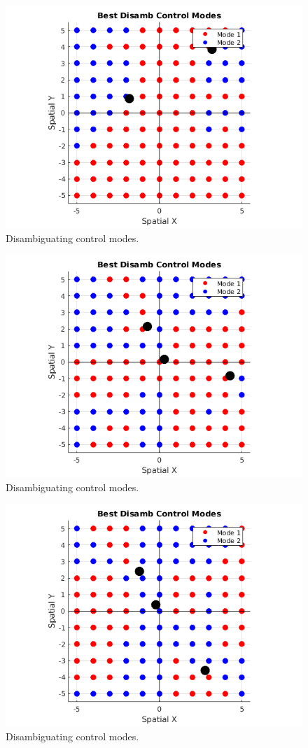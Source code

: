 \documentclass[]{article}
\begin{document}
\begin{figure}[h!]
	\centering
	\includegraphics[width = 0.6\hsize, height = 0.27\vsize]{./figures/Config2.png}
	\vspace{-0.4cm}
	\caption{Disambiguating control modes.}
\end{figure}

\begin{figure}[h]
	\centering
	\includegraphics[width = 0.6\hsize, height = 0.27\vsize]{./figures/Config3.png}
	\vspace{-0.4cm}
	\caption{Disambiguating control modes.}
\end{figure}
\begin{figure}[h!]
	\centering
	\includegraphics[width = 0.6\hsize, height = 0.25\vsize]{./figures/Config4.png}
	\vspace{-0.4cm}
	\caption{Disambiguating control modes.}
\end{figure}
\end{document}
